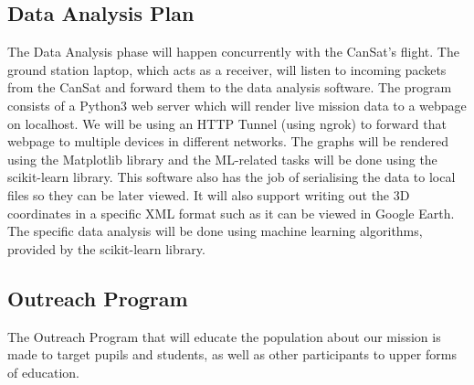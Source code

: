 \subsection{Data Analysis Plan}

The Data Analysis phase will happen concurrently with the CanSat’s flight. The ground station laptop, which acts as a receiver, will listen to incoming packets from the CanSat and forward them to the data analysis software. The program consists of a Python3 web server which will render live mission data to a webpage on localhost. We will be using an HTTP Tunnel (using ngrok) to forward that webpage to multiple devices in different networks. The graphs will be rendered using the Matplotlib library and the ML-related tasks will be done using the scikit-learn library. This software also has the job of serialising the data to local files so they can be later viewed. It will also support writing out the 3D coordinates in a specific XML format such as it can be viewed in Google Earth. The specific data analysis will be done using machine learning algorithms, provided by the scikit-learn library.

\subsection{Outreach Program}

The Outreach Program that will educate the population about our mission is made to target pupils and students, as well as other participants to upper forms of education. 

